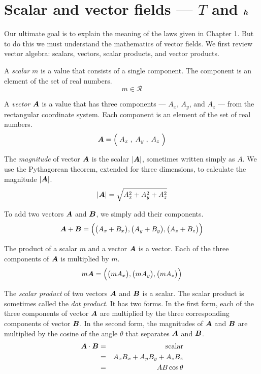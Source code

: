 \section{Scalar and vector fields --- $T$ and $\boldsymbol{h}$}

Our ultimate goal is to explain the meaning of the laws given in Chapter 1.
But to do this we must understand the mathematics of vector fields.
We first review vector algebra: scalars, vectors, scalar products, and vector products.

A \emph{scalar} $m$ is a value that consists of a single component.
The component is an element of the set of real numbers.
\begin{equation*}
  m \in \mathcal{R}
\end{equation*}

A \emph{vector} $\boldsymbol{A}$ is a value that has three components --- $A_x$, $A_y$, and $A_z$ ---
from the rectangular coordinate system.
Each component is an element of the set of real numbers.
\begin{equation*}
  \boldsymbol{A} = \Big( \; A_x \; , \; A_y \; , \; A_z \; \Big)
\end{equation*}

The \emph{magnitude} of vector $\boldsymbol{A}$ is the scalar $|\boldsymbol{A}|$,
sometimes written simply as $A$.
We use the Pythagorean theorem, extended for three dimensions, to calculate the magnitude $|\boldsymbol{A}|$.
\begin{equation*}
  |\boldsymbol{A}| = \sqrt{ A_x^2 + A_y^2 + A_z^2 }
\end{equation*}

To add two vectors $\boldsymbol{A}$ and $\boldsymbol{B}$, we simply add their components.
\begin{equation*}
  \boldsymbol{A} + \boldsymbol{B} = \Big(\big(A_x + B_x\big), \big(A_y + B_y\big), \big(A_z + B_z\big) \Big)
\end{equation*}

The product of a scalar $m$ and a vector $\boldsymbol{A}$ is a vector.
Each of the three components of $\boldsymbol{A}$ is multiplied by $m$.
\begin{equation*}
  m \boldsymbol{A} = \Big(\big(m A_x\big),\big(m A_y\big),\big( m A_z\big)\Big)
\end{equation*}

The \emph{scalar product} of two vectors $\boldsymbol{A}$ and $\boldsymbol{B}$ is a scalar.
The scalar product is sometimes called the \emph{dot product}.
It has two forms.
In the first form, each of the three components of vector $\boldsymbol{A}$ are multiplied by 
the three corresponding components of vector $\boldsymbol{B}$.
In the second form, the magnitudes of $\boldsymbol{A}$ and $\boldsymbol{B}$ 
are multiplied by the cosine of the angle $\theta$ that separates $\boldsymbol{A}$ and $\boldsymbol{B}$.
\begin{eqnarray}
  \boldsymbol{A} \cdot \boldsymbol{B} &=& \mathrm{scalar} \\
  &=& A_x B_x + A_y B_y + A_z B_z \nonumber \\
  &=& A B \cos \theta \nonumber
\end{eqnarray}

